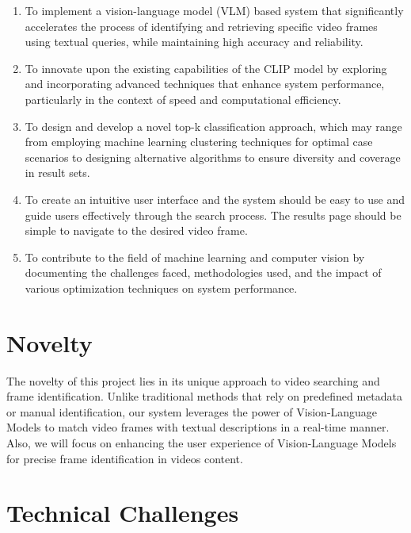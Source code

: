\documentclass[11pt]{article}
\begin{document}
\begin{enumerate}
    \item To implement a vision-language model (VLM) based system that significantly accelerates the
     process of identifying and retrieving specific video frames using textual queries, while maintaining 
     high accuracy and reliability.
    
    \item To innovate upon the existing capabilities of the CLIP model by exploring and incorporating 
    advanced techniques that enhance system performance, particularly in the context of speed and computational 
    efficiency.

    \item To design and develop a novel top-k classification approach, which may range from employing machine 
    learning clustering techniques for optimal case scenarios to designing alternative algorithms to ensure 
    diversity and coverage in result sets.
    
    \item To create an intuitive user interface and the system should be easy to use and guide users effectively 
    through the search process. The results page should be simple to navigate to the desired video frame.
    
    \item To contribute to the field of machine learning and computer vision by documenting the challenges 
    faced, methodologies used, and the impact of various optimization techniques on system performance.

\end{enumerate}



\section{Novelty}
The novelty of this project lies in its unique approach to video searching and frame identification. 
Unlike traditional methods that rely on predefined metadata or manual identification, our system leverages 
the power of Vision-Language Models to match video frames with textual descriptions in a real-time manner.
 Also, we will focus on enhancing the user experience of Vision-Language Models for precise frame identification 
 in videos content. 

 \section{Technical Challenges}
\end{document}
